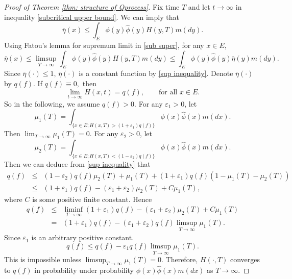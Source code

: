 \documentclass[12pt,a4paper]{amsart}
\theoremstyle{plain}
\theoremstyle{definition}
\numberwithin{equation}{section}
\begin{document}
\begin{proof}[Proof of Theorem \ref{thm: structure of Qprocess}]
Fix time $T$ and let $t\to \infty$ in inequality \eqref{subcritical upper bound}. We can imply that
\begin{equation}\label{sub super}
\overline\eta(x)\leq \int_E\phi(y)\hat \phi(y)H(y,T)m(dy).
\end{equation}
   Using Fatou's lemma for supremum limit
in \eqref{sub super}, for any $x\in E$,
\begin{equation}\label{sup inequality}
\overline\eta(x)\leq \limsup_{T\rightarrow\infty}\int_E\phi(y)\hat \phi(y)H(y,T)m(dy)\leq \int_E\phi(y)\hat\phi(y)\overline{\eta}(y)m(dy).
\end{equation}
 Since $\overline{\eta}(\cdot)\leq 1$, $\overline\eta(\cdot)$ is a constant function by \eqref{sup inequality}.
 Denote $\overline\eta(\cdot)$ by $q(f)$.  If $q(f)\equiv 0,$ then
 \begin{equation}\label{limit}
 \lim_{t\rightarrow\infty}H(x,t)=q(f),\qquad \mbox{for all}\,\, x\in E.
 \end{equation}
  So in the
following, we assume $q(f)>0$.
 For any $\varepsilon_1>0$, let
$$
\mu_1(T)=\int_{\{x\in
E;H(x,T)>(1+\varepsilon_1)q(f)\}}\phi(x)\hat\phi(x)m(dx).
$$
Then $\lim_{T\rightarrow\infty}\mu_1(T)=0.$  For any $\varepsilon_2>0$, let
$$
\mu_2(T)=\int_{\{x\in
E;H(x,T)<(1-\varepsilon_2)q(f)\}}\phi(x)\hat\phi(x)m(dx).
$$
 Then we can deduce from \eqref{sup inequality} that
\begin{eqnarray}\label{sublimitinprob}
q(f)&\leq&
(1-\varepsilon_2)q(f)\mu_2(T)+\mu_1(T)+(1+\varepsilon_1)q(f)(1-\mu_1(T)-\mu_2(T))\\
&\le
&(1+\varepsilon_1)q(f)-(\varepsilon_1+\varepsilon_2)\mu_2(T)+C\mu_1(T),
\end{eqnarray}
where $C$ is some positive finite constant.  Hence
\begin{eqnarray*}\label{sublimitinequl}
q(f)&\leq&
\liminf_{T\rightarrow\infty}(1+\varepsilon_1)q(f)-(\varepsilon_1+\varepsilon_2)\mu_2(T)+C\mu_1(T)\\
&=&(1+\varepsilon_1)q(f)-(\varepsilon_1+\varepsilon_2)q(f)\limsup_{T\rightarrow\infty}\mu_1(T).
\end{eqnarray*}
Since $\varepsilon_1$ is an arbitrary positive constant.
\[
q(f)\leq q(f)-\varepsilon_1 q(f)\limsup_{T\rightarrow\infty}\mu_1(T).
\]
This is impossible unless $\limsup_{T\rightarrow\infty}\mu_1(T)=0.$
Therefore, $H(\cdot,T)$ converges to $q(f)$ in probability under probability $\phi(x)\hat{\phi}(x)m(dx)$ as $T\to\infty$.



\end{proof}
\end{document}
